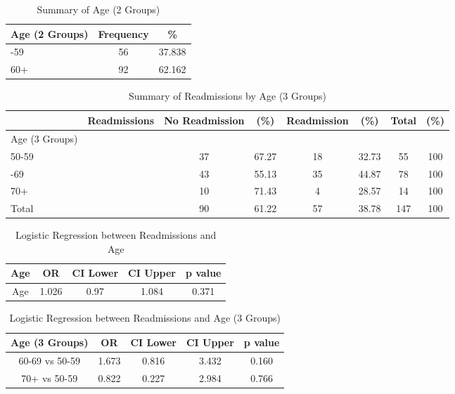 \documentclass[12pt,]{article}
\begin{document}
\begin{table}[!h]

\caption{\label{tab:unnamed-chunk-3}Summary of Age (2 Groups)}
\centering
\begin{tabular}{>{\centering\arraybackslash}p{5cm}cc}
\toprule
Age (2 Groups) & Frequency & \%\\
\midrule
50-59 & 56 & 37.838\\
\rowcolor[HTML]{E3E5E7}  60+ & 92 & 62.162\\
\bottomrule
\end{tabular}
\end{table}

\begin{table}[!h]

\caption{\label{tab:unnamed-chunk-3}Summary of Readmissions by Age (3 Groups)}
\centering
\begin{tabular}{>{\centering\arraybackslash}p{5cm}ccccccc}
\toprule
  & Readmissions & No Readmission & (\%) & Readmission & (\%) & Total & (\%)\\
\midrule
Age (3 Groups) &  &  &  &  &  &  & \\
\rowcolor[HTML]{E3E5E7}  50-59 &  & 37 & 67.27 & 18 & 32.73 & 55 & 100\\
60-69 &  & 43 & 55.13 & 35 & 44.87 & 78 & 100\\
\rowcolor[HTML]{E3E5E7}  70+ &  & 10 & 71.43 & 4 & 28.57 & 14 & 100\\
Total &  & 90 & 61.22 & 57 & 38.78 & 147 & 100\\
\bottomrule
\end{tabular}
\end{table}

\pagebreak

\begin{table}[!h]

\caption{\label{tab:unnamed-chunk-4}Logistic Regression between Readmissions and Age}
\centering
\begin{tabular}{ccccc}
\toprule
Age & OR & CI Lower & CI Upper & p value\\
\midrule
\rowcolor{white}  Age & 1.026 & 0.97 & 1.084 & 0.371\\
\bottomrule
\end{tabular}
\end{table}

\begin{table}[!h]

\caption{\label{tab:unnamed-chunk-4}Logistic Regression between Readmissions and Age (3 Groups)}
\centering
\begin{tabular}{ccccc}
\toprule
Age (3 Groups) & OR & CI Lower & CI Upper & p value\\
\midrule
60-69 vs 50-59 & 1.673 & 0.816 & 3.432 & 0.160\\
\rowcolor[HTML]{E3E5E7}  70+ vs 50-59 & 0.822 & 0.227 & 2.984 & 0.766\\
\bottomrule
\end{tabular}
\end{table}
\end{document}
